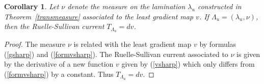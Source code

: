 \documentclass{ip-journal}
\newtheorem{theorem}{Theorem}[section]
\newtheorem{corollary}[theorem]{Corollary}
\theoremstyle{definition}
\numberwithin{equation}{section}
\begin{document}
\begin{corollary}Let $\nu$ denote the measure on the lamination $\lambda_u$ constructed in Theorem~\ref{transmeasure} associated to the least gradient map $v$. If $\Lambda_u=(\lambda_u, \nu)$, then the Ruelle-Sullivan current $T_{\Lambda_u}=dv$.
\end{corollary}

\begin{proof}The measure $\nu$ is related with the least gradient map $v$ by formulas (\ref{gsharp}) and (\ref{formvsharp}). The Ruelle-Sullivan current associated to $\nu$ is given by the derivative of a new function $v$ given by (\ref{vsharp}) which only differs from (\ref{formvsharp}) by a constant. Thus $T_{\Lambda_u}=dv$. 
\end{proof}

\end{document}
